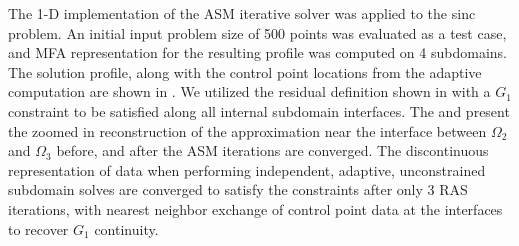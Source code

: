 The 1-D implementation of the ASM iterative solver was applied to the sinc problem. An initial input problem size of 500 points was evaluated as a test case, and MFA representation for the resulting profile was computed on 4 subdomains. The solution profile, along with the control point locations from the adaptive computation are shown in . We utilized the residual definition shown in  with a $G_1$ constraint to be satisfied along all internal subdomain interfaces. The  and  present the zoomed in reconstruction of the approximation near the interface between $\Omega_2$ and $\Omega_3$ before, and after the ASM iterations are converged. The discontinuous representation of data when performing independent, adaptive, unconstrained subdomain solves are converged to satisfy the constraints after only 3 RAS iterations, with nearest neighbor exchange of control point data at the interfaces to recover $G_1$ continuity.

